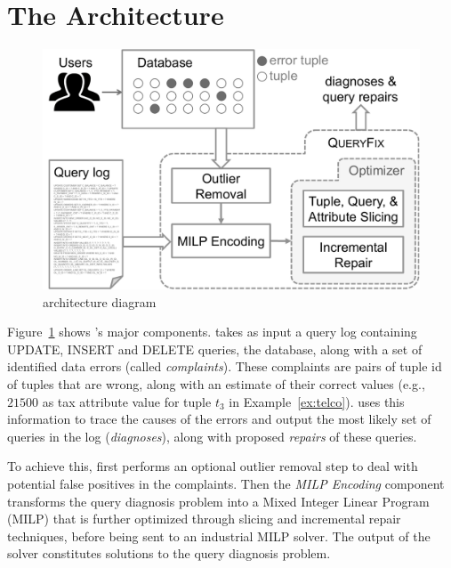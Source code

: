 \section{The {\large\textbf{\sys}} Architecture}

\begin{figure}[h]
    \centering
        \includegraphics[scale=0.3]{figures/architecture}
    \caption{\sys architecture diagram}
    \label{fig:architecture}
\end{figure}


Figure~\ref{fig:architecture} shows \sys's major components.  \sys takes as input 
a query log containing UPDATE, INSERT and DELETE queries, the database, along with a
set of identified data errors (called {\it complaints}).  These complaints are pairs
of tuple id of tuples that are wrong, along with an estimate of their correct values 
(e.g., $21500$ as tax attribute value for tuple $t_3$ in Example~\ref{ex:telco}).
\sys uses this information to trace the causes of the errors and output the most likely set of 
queries in the log ({\it diagnoses}), along with proposed {\it repairs} of these queries.

To achieve this, \sys first performs an optional outlier removal step to deal with potential
false positives in the complaints.  Then the {\it MILP Encoding} component transforms the
query diagnosis problem into a Mixed Integer Linear Program (MILP) that is further optimized
through slicing and incremental repair techniques, before being sent
to an industrial MILP solver.  The output of the solver constitutes solutions to the query diagnosis
problem.
